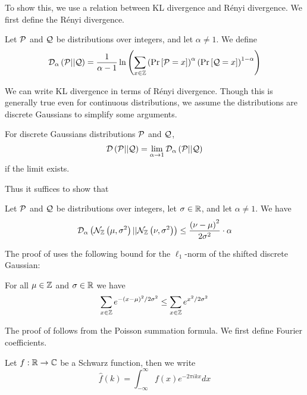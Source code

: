 \documentclass{article}
\begin{document}
To show this, we use a relation between KL divergence and R\'enyi divergence.
We first define the R\'enyi divergence.
\begin{definition}
	Let $\mathcal{P}$ and $\mathcal{Q}$ be distributions over integers, and let $\alpha\ne 1$.
	We define
	\begin{equation}
		\mathcal{D}_\alpha\left(\mathcal{P} || \mathcal{Q}\right) = \frac{1}{\alpha - 1}
		\ln\left(\sum_{x\in\mathbb{Z}}
		\left(\Pr\left[\mathcal{P}=x\right]\right)^\alpha
		\left(\Pr\left[\mathcal{Q}=x\right]\right)^{1-\alpha}\right)
	\end{equation}
\end{definition}

We can write KL divergence in terms of R\'enyi divergence.
Though this is generally true even for continuous distributions,
we assume the distributions are discrete Gaussians to simplify some arguments.
\begin{lemma}
	\label{lemma:KL-renyi}
	For discrete Gaussians distributions $\mathcal{P}$ and $\mathcal{Q}$,
	\begin{equation}
		\mathcal{D}\left(\mathcal{P} || \mathcal{Q}\right) = \lim_{\alpha\rightarrow 1}\mathcal{D}_\alpha\left(\mathcal{P} || \mathcal{Q}\right)
	\end{equation}
	if the limit exists.
\end{lemma}

Thus it suffices to show that
\begin{lemma}
	\label{lemma:DG-renyi-bound}
	Let $\mathcal{P}$ and $\mathcal{Q}$ be distributions over integers, let $\sigma\in\mathbb{R}$, and let $\alpha\ne 1$. We have
	\begin{equation}
		\mathcal{D}_\alpha\left(\mathcal{N}_{\mathbb{Z}}\left(\mu, \sigma^2\right) || \mathcal{N}_{\mathbb{Z}}\left(\nu, \sigma^2\right)\right) \leq \frac{\left(\nu - \mu\right)^2}{2\sigma^2} \cdot \alpha
	\end{equation}
\end{lemma}

The proof of  uses the following bound for the $\ell_1$-norm of the shifted discrete Gaussian:
\begin{lemma}
	\label{lemma:norm-shifted-DG}
	For all $\mu\in\mathbb{Z}$ and $\sigma\in\mathbb{R}$ we have
	\begin{equation}
		\sum_{x\in\mathbb{Z}}e^{-\left(x-\mu\right)^2 / 2\sigma^2} \leq \sum_{x\in\mathbb{Z}}e^{x^2 / 2\sigma^2} 
	\end{equation}
\end{lemma}

The proof of  follows from the Poisson summation formula.
We first define Fourier coefficients.
\begin{definition}
	Let $f:\mathbb{R}\rightarrow\mathbb{C}$ be a Schwarz function, then we write
	\begin{equation}
		\hat{f}(k)=\int_{-\infty}^{\infty} f(x)e^{-2\pi i k x} dx
	\end{equation}
\end{definition}
\end{document}
